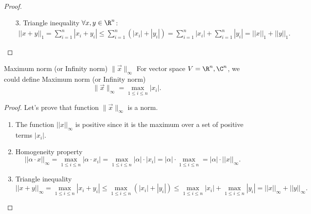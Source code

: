 \begin{proof}
    ~\\
    \begin{enumerate}
        \item[3.] Triangle inequality $\forall x, y \in \R^n$:
        \[
            \begin{array}{c}
                \displaystyle ||x+y||_1 = \sum\limits_{i=1}^n |x_i + y_i| \leq \sum\limits_{i=1}^n \left(|x_i| + |y_i|\right) =               \sum\limits_{i=1}^n |x_i| + \sum\limits_{i=1}^n |y_i| = ||x||_1 + ||y||_1.     
            \end{array}
        \]
    \end{enumerate}
\end{proof}

 \begin{definition}{Maximum norm (or Infinity norm) $\|\vec{x}\|_\infty$}{}
    For  vector space $V=\R^n, \C^n$, we could define Maximum norm (or Infinity norm)~ ~  ~  ~  ~  ~  ~  ~  ~  ~  ~ 
            \[
                \|\vec{x}\|_\infty = \max\limits_{1 \leq i \leq n} |x_i|.  
            \]
    \end{definition}
\begin{proof}
        Let's prove that function $\|\vec{x}\|_\infty$ is a norm.
        \begin{enumerate}
            \item The function $||x||_\infty$ is positive since it is the maximum over a set of positive terms $|x_i|$.
            \item Homogeneity property
            \[
                ||\alpha\cdot x ||_{\infty} = \max\limits_{1 \leq i \leq n} |\alpha\cdot x_i| = \max\limits_{1 \leq i \leq n} |\alpha| \cdot |x_i| = |\alpha| \cdot \max\limits_{1 \leq i \leq n} = |\alpha|\cdot ||x||_\infty. 
            \]
            \item Triangle inequality
            \[
                ||x+y||_{\infty} = \max\limits_{1 \leq i \leq n} |x_i + y_i| \leq \max\limits_{1 \leq i \leq n} \left(|x_i| + |y_i|\right) \leq \max\limits_{1 \leq i \leq n} |x_i| + \max\limits_{1 \leq i \leq n} |y_i| = ||x||_\infty + ||y||_\infty.
            \]
        \end{enumerate}
\end{proof}

